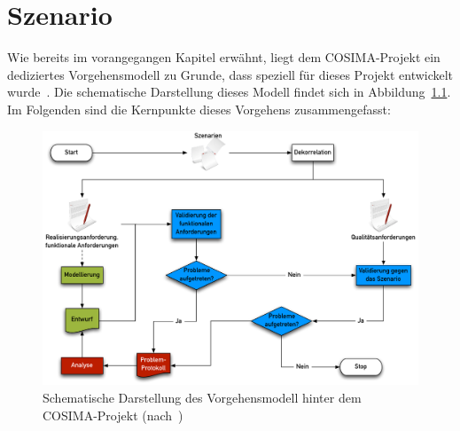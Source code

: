 
\chapter{Szenario} %
\label{cha:szenario}

  Wie bereits im vorangegangen Kapitel erwähnt, liegt dem COSIMA-Projekt ein dediziertes Vorgehensmodell zu Grunde, dass speziell für dieses Projekt entwickelt wurde~\citep[S. 7]{bericht}. Die schematische Darstellung dieses Modell findet sich in Abbildung~\ref{fig:vorgehensmodell}. Im Folgenden sind die Kernpunkte dieses Vorgehens zusammengefasst:

  \begin{figure}[!ht]
    \centering
      \includegraphics[width=.9\textwidth]{images/Vorgehensmodell}
    \caption{Schematische Darstellung des Vorgehensmodell hinter dem COSIMA-Projekt (nach~\citep{bericht})}
    \label{fig:vorgehensmodell}
  \end{figure}

